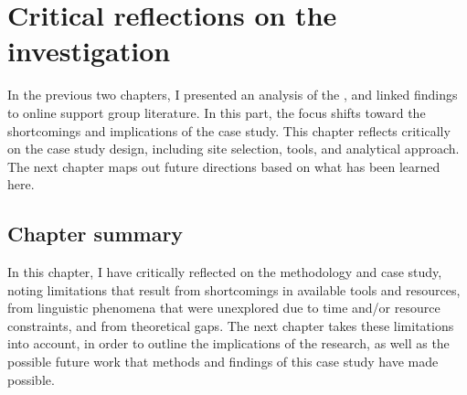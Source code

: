 
\chapter{Critical reflections on the investigation} \label{chap:reflection}

In the previous two chapters, I presented an analysis of the , and linked findings to online support group literature. In this part, the focus shifts toward the shortcomings and implications of the case study. This chapter reflects critically on the case study design, including site selection, tools, and analytical approach. The next chapter maps out future directions based on what has been learned here.



\section{Chapter summary}

In this chapter, I have critically reflected on the methodology and case study, noting limitations that result from shortcomings in available tools and resources, from linguistic phenomena that were unexplored due to time and\slash or resource constraints, and from theoretical gaps. The next chapter takes these limitations into account, in order to outline the implications of the research, as well as the possible future work that methods and findings of this case study have made possible.

%
